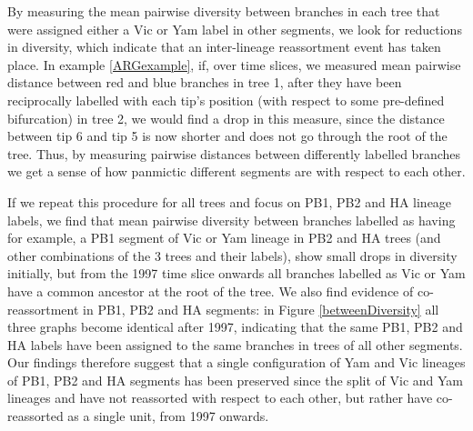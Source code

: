 \documentclass[11pt,oneside,letterpaper]{article}
\begin{document}
By measuring the mean pairwise diversity between branches in each tree that were assigned either a Vic or Yam label in other segments, we look for reductions in diversity, which indicate that an inter-lineage reassortment event has taken place.
In example \ref{ARGexample}, if, over time slices, we measured mean pairwise distance between red and blue branches in tree 1, after they have been reciprocally labelled with each tip's position (with respect to some pre-defined bifurcation) in tree 2, we would find a drop in this measure, since the distance between tip 6 and tip 5 is now shorter and does not go through the root of the tree.
Thus, by measuring pairwise distances between differently labelled branches we get a sense of how panmictic different segments are with respect to each other.

If we repeat this procedure for all trees and focus on PB1, PB2 and HA lineage labels, we find that mean pairwise diversity between branches labelled as having for example, a PB1 segment of Vic or Yam lineage in PB2 and HA trees (and other combinations of the 3 trees and their labels), show small drops in diversity initially, but from the 1997 time slice onwards all branches labelled as Vic or Yam have a common ancestor at the root of the tree.
We also find evidence of co-reassortment in PB1, PB2 and HA segments: in Figure \ref{betweenDiversity} all three graphs become identical after 1997, indicating that the same PB1, PB2 and HA labels have been assigned to the same branches in trees of all other segments.
Our findings therefore suggest that a single configuration of Yam and Vic lineages of PB1, PB2 and HA segments has been preserved since the split of Vic and Yam lineages and have not reassorted with respect to each other, but rather have co-reassorted as a single unit, from 1997 onwards.
\end{document}
